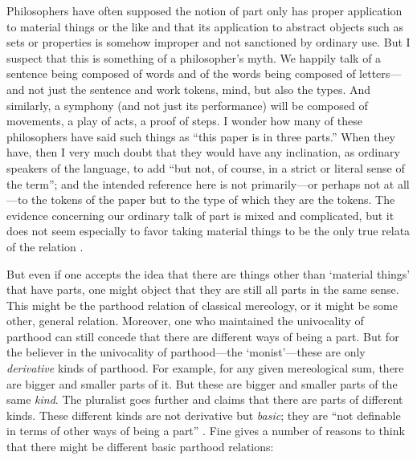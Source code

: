 \documentclass[11pt]{article}
\newenvironment{squote}{%
\begin{spacing}{1}
\begin{list}{}{%
\setlength{\labelwidth}{0pt}%
\rightmargin\leftmargin%
}
\item\relax
}{%
\end{list}%
\end{spacing}
}
\begin{document}
\begin{spacing}{1.5}
\begin{squote}
Philosophers have often supposed the notion of part only has proper
application to material things or the like and that its application
to abstract objects such as sets or properties is somehow improper
and not sanctioned by ordinary use.  But I suspect that this is
something of a philosopher’s myth.  We happily talk of a sentence
being composed of words and of the words being composed of
letters---and not just the sentence and work tokens, mind, but also
the types.  And similarly, a symphony (and not just its performance)
will be composed of movements, a play of acts, a proof of steps.  I
wonder how many of these philosophers have said such things as ``this
paper is in three parts.''  When they have, then I very much doubt
that they would have any inclination, as ordinary speakers of the
language, to add ``but not, of course, in a strict or literal sense of
the term''; and the intended reference here is not primarily---or
perhaps not at all---to the tokens of the paper but to the type of
which they are the tokens.  The evidence concerning our ordinary talk
of part is mixed and complicated, but it does not seem especially to
favor taking material things to be the only true relata of the
relation \citeyearpar[561]{fine2010}.
\end{squote}

But even if one accepts the idea that there are things other than
`material things' that have parts, one might object that they are
still all parts in the same sense.  This might be the parthood
relation of classical mereology, or it might be some other, general
relation.  Moreover, one who maintained the univocality of parthood
can still concede that there are different ways of being a part.  But
for the believer in the univocality of parthood---the `monist'---these
are only {\em derivative} kinds of parthood.  For example, for any
given mereological sum, there are bigger and smaller parts of it. But
these are bigger and smaller parts of the same {\em kind}.  The
pluralist goes further and claims that there are parts of different
kinds. These different kinds are not derivative but \emph{basic}; they
are ``not definable in terms of other ways of being a part''
\citep[561]{fine2010}.  Fine gives a number of reasons to think that
there might be different basic parthood relations:


\end{spacing}
\end{document}
